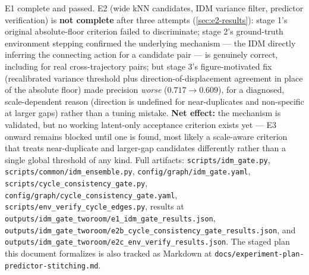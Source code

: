\documentclass[11pt]{article}
\begin{document}
E1 complete and passed. E2 (wide kNN candidates, IDM variance filter, predictor
verification) is \textbf{not complete} after three attempts (\cref{sec:e2-results}): stage
1's original absolute-floor criterion failed to discriminate; stage 2's ground-truth
environment stepping confirmed the underlying mechanism --- the IDM directly inferring the
connecting action for a candidate pair --- is genuinely correct, including for real
cross-trajectory pairs; but stage 3's figure-motivated fix (recalibrated variance threshold
plus direction-of-displacement agreement in place of the absolute floor) made precision
\emph{worse} ($0.717\to0.609$), for a diagnosed, scale-dependent reason (direction is
undefined for near-duplicates and non-specific at larger gaps) rather than a tuning mistake.
\textbf{Net effect:} the mechanism is validated, but no working latent-only acceptance
criterion exists yet --- E3 onward remains blocked until one is found, most likely a
scale-aware criterion that treats near-duplicate and larger-gap candidates differently rather
than a single global threshold of any kind. Full artifacts: \texttt{scripts/idm\_gate.py},
\texttt{scripts/common/idm\_ensemble.py}, \texttt{config/graph/idm\_gate.yaml},
\texttt{scripts/cycle\_consistency\_gate.py},
\texttt{config/graph/cycle\_consistency\_gate.yaml},
\texttt{scripts/env\_verify\_cycle\_edges.py}, results at
\texttt{outputs/idm\_gate\_tworoom/e1\_idm\_gate\_results.json},
\texttt{outputs/idm\_gate\_tworoom/e2b\_cycle\_consistency\_gate\_results.json}, and
\texttt{outputs/idm\_gate\_tworoom/e2c\_env\_verify\_results.json}. The staged plan this
document
formalizes is also tracked as Markdown at \texttt{docs/experiment-plan-predictor-stitching.md}.
\end{document}
